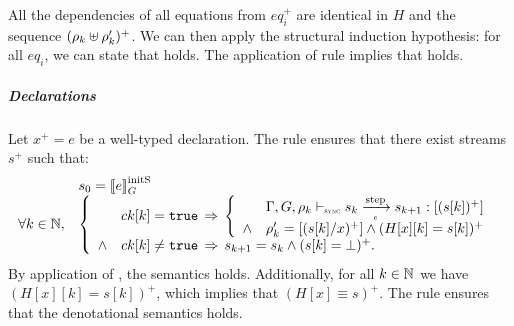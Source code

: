 \begin{skippableproof}
    All the dependencies of all equations from $eq_i^+$ are identical in $H$ and the sequence
    $(\rho_k \uplus \rho'_k)^+$.
    We can then apply the structural induction hypothesis: for all $eq_i$, we can state that
     holds. The application of rule 
    implies that  holds.

    \subparagraph{Declarations}
    Let $x^+ = e$ be a well-typed declaration. The rule  ensures that there exist streams $s^+$ such that:
    \begin{equation*}
        \begin{array}{ll}
                              & s_0 = \initstate{e} \\
            \forall k \in \N, &
            \left\{
            \begin{array}{ll}
                       & ck[k] = \true \, \Rightarrow \,
                \left\{
                \begin{array}{ll}
                           & \exprOpsem{\rho_k}{s_k}{e}{s_{k+1}}{(s[k])^+}      \\
                    \wedge & \rho'_k = [(s[k] / x)^+] \wedge (H[x][k] = s[k])^+ \\
                \end{array}
                \right.                                                                           \\
                \wedge & ck[k] \neq \true \, \Rightarrow \, s_{k+1} = s_k \wedge (s[k] = \bot)^+. \\
            \end{array}
            \right.
        \end{array}
    \end{equation*}
    By application of , the semantics 
    holds. Additionally, for all $k \in \mathbb{N}$ we have $(H[x][k] = s[k])^+$, which implies that
    $(H[x] \equiv s)^+$. The rule  ensures that the
    denotational semantics  holds.


\end{skippableproof}
